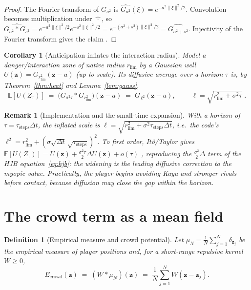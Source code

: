 \documentclass[11pt]{article}
\newtheorem{corollary}[theorem]{Corollary}
\newtheorem{definition}[theorem]{Definition}
\newtheorem*{remark}{Remark}
\newcommand{\E}{\mathbb{E}}
\newcommand{\rlim}{r_{\mathrm{lim}}}
\newcommand{\z}{\mathbf{z}}
\begin{document}
\begin{proof}
The Fourier transform of $G_{a^2}$ is $\widehat{G_{a^2}}(\xi)=e^{-a^2\|\xi\|^2/2}$.
Convolution becomes multiplication under $\widehat{\ \cdot\ }$, so
$\widehat{G_{a^2}\ast G_{s^2}}=e^{-a^2\|\xi\|^2/2}e^{-s^2\|\xi\|^2/2}
=e^{-(a^2+s^2)\|\xi\|^2/2}=\widehat{G_{a^2+s^2}}$. Injectivity of the Fourier
transform gives the claim \cite[Ch.~8]{Folland}.
\end{proof}

\begin{corollary}[Anticipation inflates the interaction radius]\label{cor:length}
Model a danger/interaction zone of native radius $\rlim$ by a Gaussian well
$U(\z)=G_{\rlim^2}(\z-a)$ (up to scale). Its diffusive average over a horizon
$\tau$ is, by Theorem~\ref{thm:heat} and Lemma~\ref{lem:gauss},
\[
  \E[U(Z_\tau)] \;=\; \big(G_{\sigma^2\tau}\ast G_{\rlim^2}\big)(\z-a)
  \;=\; G_{\,\ell^2}(\z-a),\qquad
  \boxed{\;\ell=\sqrt{\rlim^{2}+\sigma^{2}\tau}\;}.
\]
\end{corollary}

\begin{remark}[Implementation and the small-time expansion]
With a horizon of $\tau=\tau_{\mathrm{steps}}\Delta t$, the inflated scale is
$\ell=\sqrt{\rlim^2+\sigma^2\tau_{\mathrm{steps}}\Delta t}$, i.e.\ the code's
$\ell^2=\rlim^2+(\sigma\sqrt{\Delta t}\,\sqrt{\tau_{\mathrm{steps}}})^2$. To first
order, It\^o/Taylor gives
$\E[U(Z_\tau)]=U(\z)+\tfrac{\sigma^2\tau}{2}\Delta U(\z)+o(\tau)$ \cite{Oksendal},
reproducing the $\tfrac{\sigma^2}{2}\Delta$ term of the HJB
equation~\eqref{eq:hjb}: the widening is the leading diffusive correction to the
myopic value. Practically, the player begins avoiding Kaya and stronger rivals
\emph{before} contact, because diffusion may close the gap within the horizon.
\end{remark}

\newpage
\section{The crowd term as a mean field}\label{sec:meanfield}

\begin{definition}[Empirical measure and crowd potential]
Let $\mu_N=\frac1N\sum_{j=1}^N\delta_{\z_j}$ be the empirical measure of player
positions and, for a short-range repulsive kernel $W\ge0$,
\begin{equation}\label{eq:crowd}
  E_{\mathrm{crowd}}(\z)\;=\;(W\ast\mu_N)(\z)\;=\;\frac1N\sum_{j=1}^N W(\z-\z_j).
\end{equation}
\end{definition}
\end{document}
